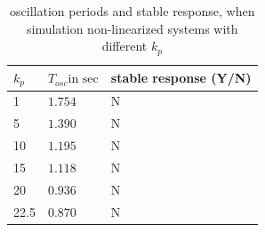 \begin{table}[H]
\centering
\caption{oscillation periods and stable response, when simulation non-linearized systems with different $k_p$}
\label{tab:sim_res_non_linearized_kp}
\begin{tabular}{|l|l|l|}
\hline
\rowcolor[HTML]{C0C0C0} 
$k_p$ & $T_{osc} \text{in sec}$ & stable response (Y/N) \\ \hline
1     & $1.754$                 & N                     \\ \hline
5     & $1.390$                 & N                     \\ \hline
10    & $1.195$                 & N                     \\ \hline
15    & $1.118$                 & N                     \\ \hline
20    & $0.936$                 & N                     \\ \hline
22.5  & $0.870$                 & N                     \\ \hline
\end{tabular}
\end{table}